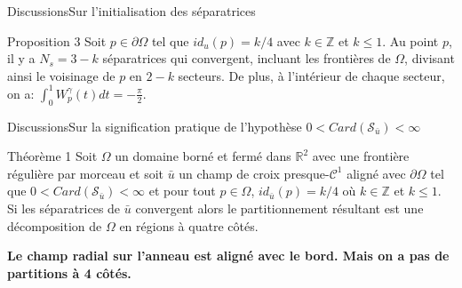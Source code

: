 \documentclass[compress,10pt,aspectratio=169]{beamer}
\begin{document}
\begin{frame}{Discussions}{Sur l'initialisation des séparatrices}
{\begin{onerablock}{\small Proposition 3}
\small
Soit $p\in\partial\Omega$ tel que $id_u(p)=k/4$ avec $k\in\mathbb{Z}$ et $k\leq 1$. Au point $p$, il y a $N_s=3-k$ séparatrices qui convergent, incluant les frontières de $\Omega$, divisant ainsi le voisinage de $p$ en $2-k$ secteurs. De plus, à l'intérieur de chaque secteur, on a: $\int_0^1W_p^\gamma(t)dt=-\frac{\pi}{2}.$
\end{onerablock}

}

\end{frame}


\begin{frame}{Discussions}{Sur la signification pratique de l'hypothèse $0<Card(\mathcal{S}_{\bar{u}})<\infty$}
\centering
    \small
\begin{onerablock}{\small Théorème 1}
    \small
Soit $\Omega$ un domaine borné et fermé dans $\mathbb{R}^2$ avec une frontière régulière par morceau et soit $\bar{u}$ un champ de croix presque-$\mathcal{C}^1$ aligné avec $\partial\Omega$ tel que $0<Card(\mathcal{S}_{\bar{u}})<\infty$ et pour tout $p\in\Omega$, $id_{\bar{u}}(p)=k/4$ où $k\in\mathbb{Z}$ et $k\leq 1$. Si les séparatrices de $\bar{u}$ convergent alors le partitionnement résultant est une décomposition de $\Omega$ en régions à quatre côtés.
\end{onerablock}
{\bf\footnotesize\color{onera_gray} Le champ radial sur l'anneau est aligné avec le bord. Mais on a pas de partitions à 4 côtés.}\\
\begin{columns}
\begin{column}{0.33\textwidth}
\centering
\end{column}


\end{columns}
\end{frame}
\end{document}
